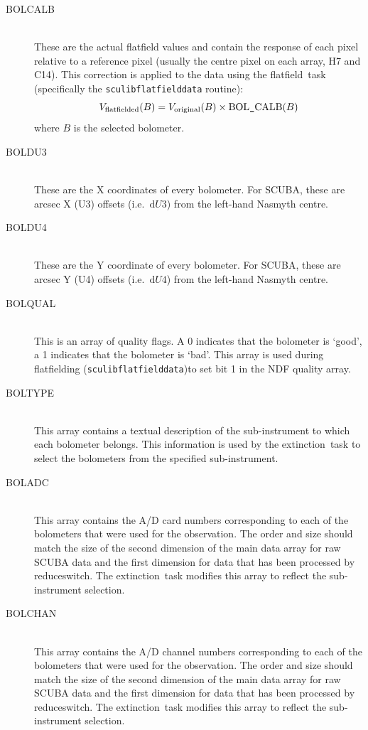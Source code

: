 \documentclass[twoside,11pt]{article}
\newcommand{\task}[1]{{\sf #1}}
\newcommand{\resw}{\xref{\task{reduce\_switch}}{sun216}{REDUCE_SWITCH}}
\newcommand{\flatf}{\xref{\task{flatfield}}{sun216}{FLATFIELD}}
\newcommand{\ext}{\xref{\task{extinction}}{sun216}{EXTINCTION}}
\newcommand{\xref}[3]{#1}
\renewcommand{\_}{\texttt{\symbol{95}}}
\begin{document}
\begin{description}
\item[BOL\_CALB]\mbox{} \\
These are the actual flatfield values and contain the response of each pixel
relative to a reference pixel (usually the centre pixel on each array, H7 and
C14). This correction is applied to the data using the \flatf\ task
(specifically the \texttt{sculib\_flatfield\_data} routine):
\begin{equation}
V_\mathrm{flatfielded}(B) = V_\mathrm{original}(B) \times \mathrm{BOL\_CALB}(B)
\end{equation}
where $B$ is the selected bolometer.

\item[BOL\_DU3]\mbox{} \\
These are the X coordinates of every bolometer. For SCUBA, these are arcsec X
(U3) offsets (i.e.\ $\mathrm{d}U3$) from the left-hand Nasmyth centre.

\item[BOL\_DU4]\mbox{} \\
These are the Y coordinate of every bolometer. For SCUBA, these are arcsec Y
(U4) offsets (i.e.\ $\mathrm{d}U4$) from the left-hand Nasmyth centre.

\item[BOL\_QUAL]\mbox{} \\
This is an array of quality flags. A 0 indicates that the bolometer is `good',
a 1 indicates that the bolometer is `bad'. This array is used during
flatfielding (\texttt{sculib\_flatfield\_data})to set bit 1 in the NDF
quality array.

\item[BOL\_TYPE]\mbox{}\\
This array contains a textual description of the sub-instrument to which each
bolometer belongs. This information is used by the \ext\ task to select the
bolometers from the specified sub-instrument.

\item[BOL\_ADC]\mbox{}\\
This array contains the A/D card numbers corresponding to each of the
bolometers that were used for the observation. The order and size should match
the size of the second dimension of the main data array for raw SCUBA data and
the first dimension for data that has been processed by \resw. The \ext\ task
modifies this array to reflect the sub-instrument selection.

\item[BOL\_CHAN]\mbox{}\\
This array contains the A/D channel numbers corresponding to each of the
bolometers that were used for the observation. The order and size should match
the size of the second dimension of the main data array for raw SCUBA data and
the first dimension for data that has been processed by \resw. The \ext\ task
modifies this array to reflect the sub-instrument selection.


\end{description}
\end{document}
